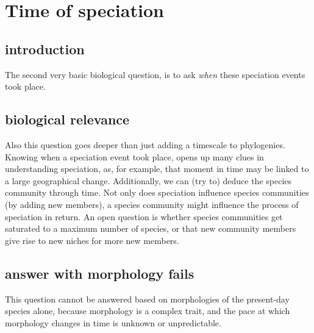 {%
\section{Time of speciation}

\subsection{introduction}

The second very basic biological question, is to 
ask \emph{when} these speciation events took place.

\subsection{biological relevance}

Also this question goes deeper than just 
adding a timescale to phylogenies.
Knowing when a speciation event took place,
opens up many clues in understanding speciation, as,
for example, that moment in time may be linked to a large geographical change.
Additionally, we can (try to) deduce the species community through time.
Not only does speciation influence species communities (by adding
new members), a species community might influence the process of speciation
in return. An open question is whether species communities get
saturated to a maximum number of species, or that new community members
give rise to new niches for more new members.

\subsection{answer with morphology fails}

This question cannot be answered based on morphologies of the present-day
species alone, because morphology is a complex trait, and the pace at
which morphology changes in time is unknown or unpredictable.

}
